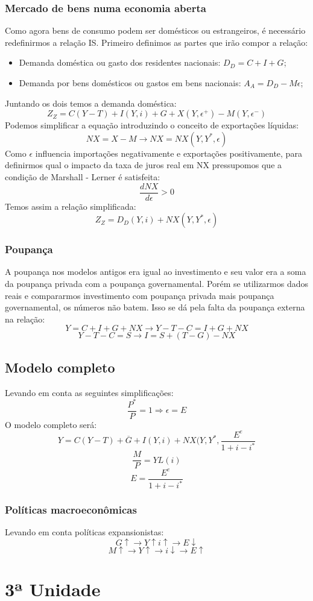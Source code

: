 \documentclass[12pt,a4paper,oneside,brazil]{abntex2}
\begin{document}
\subsection{Mercado de bens numa economia aberta}
Como agora bens de consumo podem ser domésticos ou estrangeiros, é necessário redefinirmos a relação IS. Primeiro definimos as partes que irão compor a relação:
\begin{itemize}
\item Demanda doméstica ou gasto dos residentes nacionais: $D_D = C + I + G$;
\item Demanda por bens domésticos ou gastos em bens nacionais: $A_A = D_D - M \epsilon$;
\end{itemize}
Juntando os dois temos a demanda doméstica:
\[ Z_Z = C (Y - T) + I ( Y, i) + G + X (Y, \epsilon^+) - M (Y, \epsilon^-) \]
Podemos simplificar a equação introduzindo o conceito de exportações líquidas:
\[ NX = X - M \rightarrow NX = NX(Y, Y^{*}, \epsilon) \]
Como $\epsilon$ influencia importações negativamente e exportações positivamente, para definirmos qual o impacto da taxa de juros real em NX pressupomos que a condição de Marshall - Lerner é satisfeita:
\[ \frac{d NX}{d \epsilon} > 0\]
Temos assim a relação simplificada:
\[ Z_Z = D_D ( Y, i ) + NX (Y, Y^{*}, \epsilon) \]

\subsection{Poupança}
A poupança nos modelos antigos era igual ao investimento e seu valor era a soma da poupança privada com a poupança governamental. Porém se utilizarmos dados reais e compararmos investimento com poupança privada mais poupança governamental, os números não batem. Isso se dá pela falta da poupança externa na relação:
\[ Y  = C + I + G + NX \rightarrow Y - T - C  = I + G + NX\]
\[ Y - T -C = S \rightarrow I = S + (T -G) - NX \]

\section{Modelo completo}
Levando em conta as seguintes simplificações:
\[ \frac{P^{*}}{P} = 1 \Rightarrow  \epsilon = E\]
O modelo completo será:
\begin{equation}\label{IS}
Y = C (Y - T) + \overline{G} + I  (Y, i ) + NX ( Y, Y^{*}, \frac{E^e}{1 + i - i^{*}}
\end{equation}
\begin{equation}\label{LM}
\frac{M}{P} = Y L (i)
\end{equation}
\begin{equation}\label{E}
E = \frac{E^e}{1 + i - i^{*}}
\end{equation}

\subsection{Políticas macroeconômicas}
Levando em conta políticas expansionistas:
\[ G \uparrow  \rightarrow Y \uparrow i \uparrow \rightarrow E\downarrow\]
\[ M \uparrow \rightarrow Y \uparrow \rightarrow i \downarrow \rightarrow E \uparrow\]

\chapter{3ª Unidade}
\printbibliography
\end{document}
